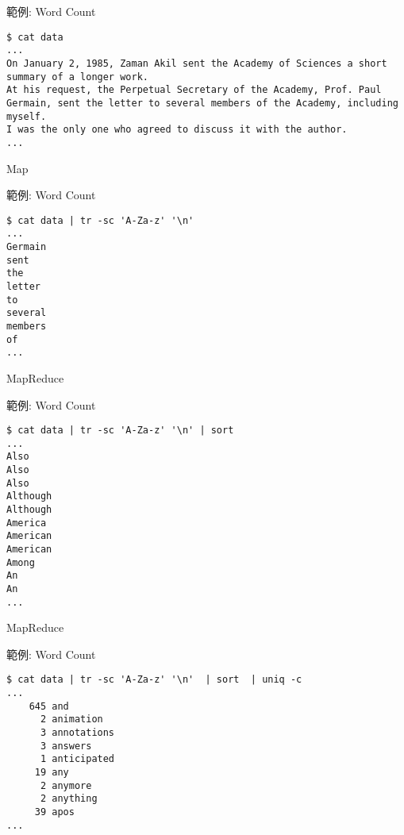 \documentclass[12pt,c]{beamer}
\begin{document}
\begin{frame}[containsverbatim]{範例: Word Count}
\begin{verbatim}
$ cat data 
...
On January 2, 1985, Zaman Akil sent the Academy of Sciences a short summary of a longer work.
At his request, the Perpetual Secretary of the Academy, Prof. Paul Germain, sent the letter to several members of the Academy, including myself.
I was the only one who agreed to discuss it with the author.
...
\end{verbatim}
\end{frame}

\begin{frame}{Map}
\end{frame}


\begin{frame}[containsverbatim]{範例: Word Count}
\begin{verbatim}
$ cat data | tr -sc 'A-Za-z' '\n' 
...
Germain
sent
the
letter
to
several
members
of
...
\end{verbatim}
\end{frame}

\begin{frame}{MapReduce}
\end{frame}



\begin{frame}[containsverbatim]{範例: Word Count}
\begin{verbatim}
$ cat data | tr -sc 'A-Za-z' '\n' | sort
...
Also
Also
Also
Although
Although
America
American
American
Among
An
An
...

\end{verbatim}
\end{frame}

\begin{frame}{MapReduce}
\end{frame}


\begin{frame}[containsverbatim]{範例: Word Count}
\begin{verbatim}
$ cat data | tr -sc 'A-Za-z' '\n'  | sort  | uniq -c
...
    645 and
      2 animation
      3 annotations
      3 answers
      1 anticipated
     19 any
      2 anymore
      2 anything
     39 apos
...
\end{verbatim}
\end{frame}
\end{document}
